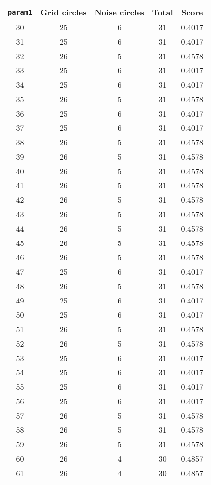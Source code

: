 \documentclass[letterpaper, 12pt]{article}
\begin{document}
\begin{longtable}{|c|c|c|c|c|}
\hline
\textbf{\texttt{param1}} & \textbf{Grid circles} & \textbf{Noise circles} & \textbf{Total} & \textbf{Score} \\
\hline
30 & 25 & 6 & 31 & 0.4017 \\
\hline
31 & 25 & 6 & 31 & 0.4017 \\
\hline
32 & 26 & 5 & 31 & 0.4578 \\
\hline
33 & 25 & 6 & 31 & 0.4017 \\
\hline
34 & 25 & 6 & 31 & 0.4017 \\
\hline
35 & 26 & 5 & 31 & 0.4578 \\
\hline
36 & 25 & 6 & 31 & 0.4017 \\
\hline
37 & 25 & 6 & 31 & 0.4017 \\
\hline
38 & 26 & 5 & 31 & 0.4578 \\
\hline
39 & 26 & 5 & 31 & 0.4578 \\
\hline
40 & 26 & 5 & 31 & 0.4578 \\
\hline
41 & 26 & 5 & 31 & 0.4578 \\
\hline
42 & 26 & 5 & 31 & 0.4578 \\
\hline
43 & 26 & 5 & 31 & 0.4578 \\
\hline
44 & 26 & 5 & 31 & 0.4578 \\
\hline
45 & 26 & 5 & 31 & 0.4578 \\
\hline
46 & 26 & 5 & 31 & 0.4578 \\
\hline
47 & 25 & 6 & 31 & 0.4017 \\
\hline
48 & 26 & 5 & 31 & 0.4578 \\
\hline
49 & 25 & 6 & 31 & 0.4017 \\
\hline
50 & 25 & 6 & 31 & 0.4017 \\
\hline
51 & 26 & 5 & 31 & 0.4578 \\
\hline
52 & 26 & 5 & 31 & 0.4578 \\
\hline
53 & 25 & 6 & 31 & 0.4017 \\
\hline
54 & 25 & 6 & 31 & 0.4017 \\
\hline
55 & 25 & 6 & 31 & 0.4017 \\
\hline
56 & 25 & 6 & 31 & 0.4017 \\
\hline
57 & 26 & 5 & 31 & 0.4578 \\
\hline
58 & 26 & 5 & 31 & 0.4578 \\
\hline
59 & 26 & 5 & 31 & 0.4578 \\
\hline
60 & 26 & 4 & 30 & 0.4857 \\
\hline
61 & 26 & 4 & 30 & 0.4857 \\

\end{longtable}
\end{document}
